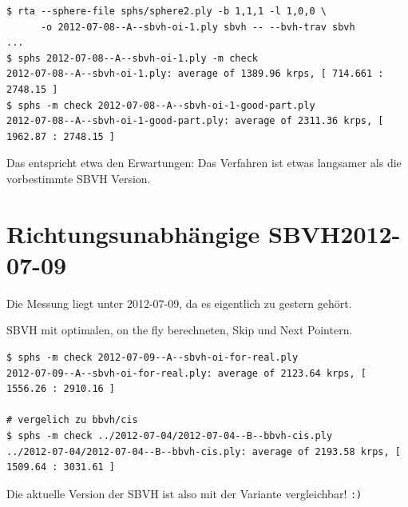 \documentclass[a4paper,11pt]{article}
\begin{document}
{\small\begin{verbatim}
$ rta --sphere-file sphs/sphere2.ply -b 1,1,1 -l 1,0,0 \
      -o 2012-07-08--A--sbvh-oi-1.ply sbvh -- --bvh-trav sbvh
...
$ sphs 2012-07-08--A--sbvh-oi-1.ply -m check
2012-07-08--A--sbvh-oi-1.ply: average of 1389.96 krps, [ 714.661 : 2748.15 ]
$ sphs -m check 2012-07-08--A--sbvh-oi-1-good-part.ply 
2012-07-08--A--sbvh-oi-1-good-part.ply: average of 2311.36 krps, [ 1962.87 : 2748.15 ]
\end{verbatim}}

Das entspricht etwa den Erwartungen: Das Verfahren ist etwas langsamer als die vorbestimmte SBVH Version.

\section{Richtungsunabhängige SBVH\hfill 2012-07-09}
Die Messung liegt unter 2012-07-09, da es eigentlich zu gestern gehört.

SBVH mit optimalen, on the fly berechneten, Skip und Next Pointern.

{\small\begin{verbatim}
$ sphs -m check 2012-07-09--A--sbvh-oi-for-real.ply 
2012-07-09--A--sbvh-oi-for-real.ply: average of 2123.64 krps, [ 1556.26 : 2910.16 ]

# vergelich zu bbvh/cis
$ sphs -m check ../2012-07-04/2012-07-04--B--bbvh-cis.ply 
../2012-07-04/2012-07-04--B--bbvh-cis.ply: average of 2193.58 krps, [ 1509.64 : 3031.61 ]
\end{verbatim}}

Die aktuelle Version der SBVH ist also mit der \cis Variante vergleichbar! {\tt:)}
\end{document}
